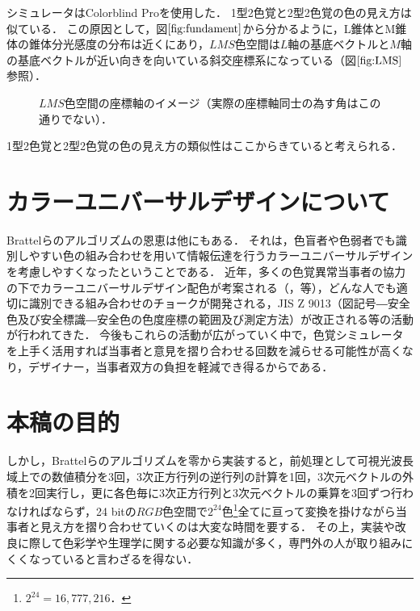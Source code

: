 \documentclass[uplatex,paper=a4,fontsize=4.0truemm,jafontsize=4.0truemm,head_space=30.0truemm,foot_space=30.0truemm,baselineskip=8.0truemm,line_length=40zw,gutter=25.0truemm,oneside,openany,fleqn,hanging_panctuation,open_bracket_pos=nibu_tentsuki,dvipdfmx,jis2004,book,titlepage]{jlreq}
\theoremstyle{mystyle}
\newcommand{\captiondot}[1]{\caption{#1．}}
\newcommand{\mathdisplaystyle}[1]{\(\displaystyle{#1}\)}
\newcommand{\Reference}[1]{\mathdisplaystyle{\ref{#1}}}
\begin{document}
			シミュレータはColorblind Proを使用した．
			1型2色覚と2型2色覚の色の見え方は似ている．
			この原因として，図\Reference{fig:fundament}から分かるように，L錐体とM錐体の錐体分光感度の分布は近くにあり，\mathdisplaystyle{LMS}色空間は\mathdisplaystyle{L}軸の基底ベクトルと\mathdisplaystyle{M}軸の基底ベクトルが近い向きを向いている斜交座標系になっている（図\Reference{fig:LMS}参照）．
			\begin{figure}[tbp]
				\centering
				\captiondot{\protect\mathdisplaystyle{LMS}色空間の座標軸のイメージ（実際の座標軸同士の為す角はこの通りでない）}\label{fig:LMS}
			\end{figure}
			1型2色覚と2型2色覚の色の見え方の類似性はここからきていると考えられる．
		\section{カラーユニバーサルデザインについて}
			Brattelらのアルゴリズムの恩恵は他にもある．
			それは，色盲者や色弱者でも識別しやすい色の組み合わせを用いて情報伝達を行うカラーユニバーサルデザインを考慮しやすくなったということである．
			近年，多くの色覚異常当事者の協力の下でカラーユニバーサルデザイン配色が考案される（\cite[pp.~1091--1099]{Okabe2002c}，\cite{cudo2018}等），どんな人でも適切に識別できる組み合わせのチョークが開発される\cite{Rikagaku2020}，JIS Z 9013（図記号―安全色及び安全標識―安全色の色度座標の範囲及び測定方法）が改正される\cite{Nakano2018}等の活動が行われてきた．
			今後もこれらの活動が広がっていく中で，色覚シミュレータを上手く活用すれば当事者と意見を摺り合わせる回数を減らせる可能性が高くなり，デザイナー，当事者双方の負担を軽減でき得るからである．
		\section{本稿の目的}
			しかし，Brattelらのアルゴリズムを零から実装すると，前処理として可視光波長域上での数値積分を3回，3次正方行列の逆行列の計算を1回，3次元ベクトルの外積を2回実行し，更に各色毎に3次正方行列と3次元ベクトルの乗算を3回ずつ行わなければならず，24 bitの\mathdisplaystyle{RGB}色空間で\mathdisplaystyle{2^{24}}色\footnote{\mathdisplaystyle{2^{24}=16{,}777{,}216}．}全てに亘って変換を掛けながら当事者と見え方を摺り合わせていくのは大変な時間を要する．
			その上，実装や改良に際して色彩学や生理学に関する必要な知識が多く，専門外の人が取り組みにくくなっていると言わざるを得ない．
\end{document}
